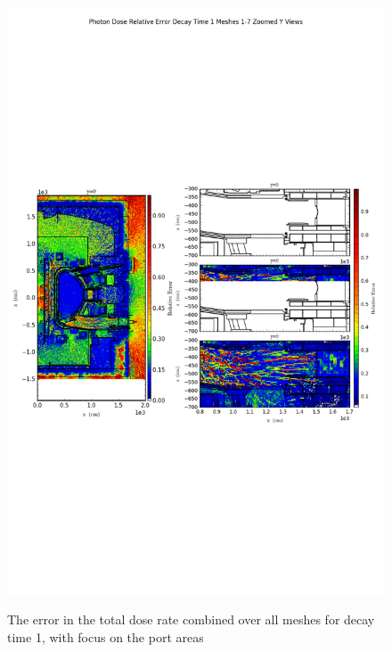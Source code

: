 \documentclass[12pt]{article}
\begin{document}
\begin{figure}[ht!]
\centering
\includegraphics[trim={0cm 9cm 0cm 10cm},clip,scale=0.75]{../plots/final_model/Photon_Dose_Relative_Error_Decay_Time_1_Meshes_1-7_Zoomed_Y_Views.png}
\label{fig:photons_dc1_no4bc_total_error_zoomed}
\caption{The error in the total dose rate combined over all meshes for decay time 1, with focus on the port areas}
\end{figure}

\clearpage
\end{document}
